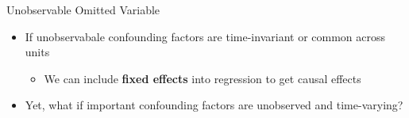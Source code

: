 \documentclass[dvipsnames,hyperref={pdfpagelabels=false}]{beamer}
\begin{document}
\begin{frame}{Unobservable Omitted Variable}

\begin{itemize}

\item If unobservabale confounding factors are time-invariant or common across units
\vspace{0.2cm}
\begin{itemize}
\item We can include \textbf{fixed effects} into regression to get causal effects
\end{itemize}
\vspace{0.2cm}
\item Yet, what if important confounding factors are unobserved and time-varying?





\end{itemize}

\end{frame}
\end{document}
